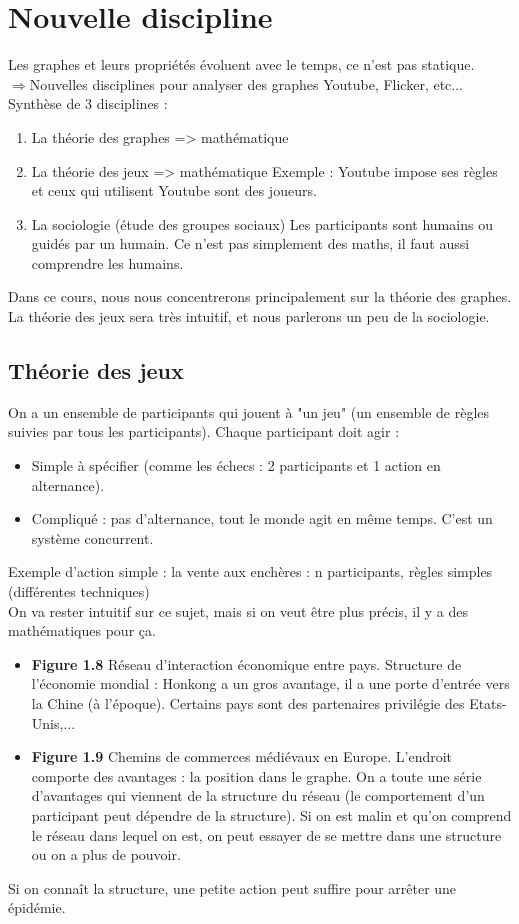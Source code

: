\section{Nouvelle discipline}
Les graphes et leurs propriétés évoluent avec le temps, ce n'est pas statique.\\
$\Rightarrow$Nouvelles disciplines pour analyser des graphes Youtube, Flicker, etc...\\
Synthèse de 3 disciplines :
\begin{enumerate}

	\item La théorie des graphes => mathématique
	\item La théorie des jeux => mathématique
		Exemple : Youtube impose ses règles et ceux qui utilisent Youtube sont des joueurs.
	\item La sociologie (étude des groupes sociaux) Les participants sont humains ou guidés par  un 	    humain. Ce n'est pas simplement des maths, il faut aussi comprendre les humains.\\
\end{enumerate}
Dans ce cours, nous nous concentrerons principalement sur la théorie des graphes. La théorie des jeux sera très intuitif, et nous parlerons un peu de la sociologie.
\subsection{Théorie des jeux}
On a un ensemble de participants qui jouent à "un jeu" (un ensemble de règles suivies par tous les participants). Chaque participant doit agir : 
\begin{itemize}

\item Simple à spécifier (comme les échecs : 2 participants et 1 action en alternance). 
\item Compliqué : pas d'alternance, tout le monde agit en même temps. C'est un système concurrent.
\end{itemize}
Exemple d'action simple : la vente aux enchères : 
	n participants,
	règles simples (différentes techniques) \\
	
On va rester intuitif sur ce sujet, mais si on veut être plus précis, il y a des mathématiques pour ça.
\begin{itemize}

\item \textbf{Figure 1.8} Réseau d'interaction économique entre pays. Structure de l'économie mondial : Honkong a un gros avantage, il a une porte d'entrée vers la Chine (à l'époque). Certains pays sont des partenaires privilégie des Etats-Unis,... 
\item \textbf{Figure 1.9} Chemins de commerces médiévaux en Europe. L'endroit comporte des avantages : la position dans le graphe. On a toute une série d'avantages qui viennent de la structure du réseau (le comportement d'un participant peut dépendre de la structure). Si on est malin et qu'on comprend le réseau dans lequel on est, on peut essayer de se mettre dans une structure ou on a plus de pouvoir. 
\end{itemize}
Si on connaît la structure, une petite action peut suffire pour arrêter une épidémie.

